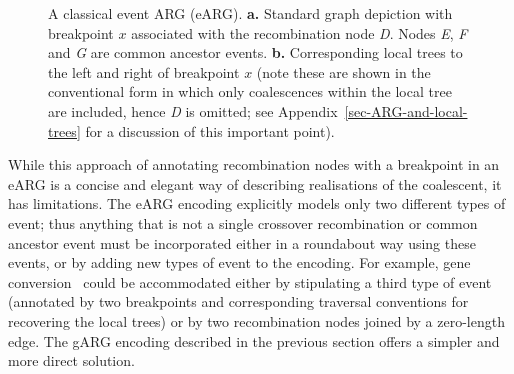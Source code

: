 \documentclass[9pt,twocolumn,twoside]{gsajnl}
\newcommand{\noderef}[1]{\textit{#1}}
\begin{document}
\begin{figure}
\caption{\label{fig-event-arg}
A classical event ARG (eARG). \textbf{a.} Standard graph depiction with
breakpoint $x$ associated with the recombination node \noderef{D}.
Nodes \noderef{E}, \noderef{F} and \noderef{G} are common ancestor events.
\textbf{b.} Corresponding local trees to the left and right of breakpoint $x$
(note these are shown in the conventional form in which only coalescences
within the local tree are included, hence \noderef{D} is omitted; see
Appendix~\ref{sec-ARG-and-local-trees} for a discussion of this important point).
}
\end{figure}

While this approach of annotating recombination nodes with a
breakpoint in an eARG is a concise and elegant way of describing realisations
of the coalescent, it has limitations.
The eARG encoding explicitly models only
two different types of event; thus anything that is not a single crossover
recombination or common ancestor event must be incorporated
either in a roundabout way using these
events, or by adding new types of event to the encoding. For example, gene
conversion~\citep{wiuf2000coalescent} could 
be accommodated either by stipulating a third type of event
(annotated by two breakpoints and corresponding traversal conventions for
recovering the local trees) or by two recombination nodes joined by a
zero-length edge. The gARG encoding described in the previous
section offers a simpler and more direct solution.
\end{document}
